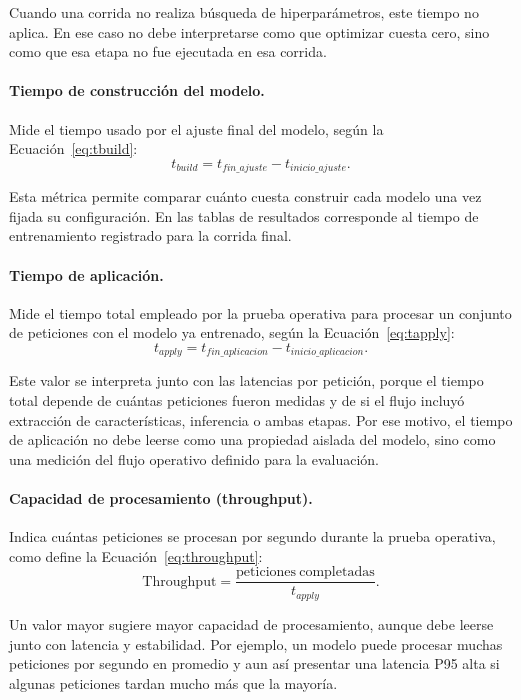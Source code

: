\documentclass[12pt,oneside]{report}
\begin{document}
Cuando una corrida no realiza búsqueda de hiperparámetros, este tiempo no aplica. En ese caso no debe interpretarse como que optimizar cuesta cero, sino como que esa etapa no fue ejecutada en esa corrida.

\paragraph{Tiempo de construcción del modelo.}
Mide el tiempo usado por el ajuste final del modelo, según la Ecuación~\eqref{eq:tbuild}:
\begin{equation}
\label{eq:tbuild}
t_{build}=t_{fin\_ajuste}-t_{inicio\_ajuste}.
\end{equation}

Esta métrica permite comparar cuánto cuesta construir cada modelo una vez fijada su configuración. En las tablas de resultados corresponde al tiempo de entrenamiento registrado para la corrida final.

\paragraph{Tiempo de aplicación.}
Mide el tiempo total empleado por la prueba operativa para procesar un conjunto de peticiones con el modelo ya entrenado, según la Ecuación~\eqref{eq:tapply}:
\begin{equation}
\label{eq:tapply}
t_{apply}=t_{fin\_aplicacion}-t_{inicio\_aplicacion}.
\end{equation}

Este valor se interpreta junto con las latencias por petición, porque el tiempo total depende de cuántas peticiones fueron medidas y de si el flujo incluyó extracción de características, inferencia o ambas etapas. Por ese motivo, el tiempo de aplicación no debe leerse como una propiedad aislada del modelo, sino como una medición del flujo operativo definido para la evaluación.

\paragraph{Capacidad de procesamiento (throughput).}
Indica cuántas peticiones se procesan por segundo durante la prueba operativa, como define la Ecuación~\eqref{eq:throughput}:
\begin{equation}
\label{eq:throughput}
\mathrm{Throughput}=\frac{\mathrm{peticiones\ completadas}}{t_{apply}}.
\end{equation}

Un valor mayor sugiere mayor capacidad de procesamiento, aunque debe leerse junto con latencia y estabilidad. Por ejemplo, un modelo puede procesar muchas peticiones por segundo en promedio y aun así presentar una latencia P95 alta si algunas peticiones tardan mucho más que la mayoría.
\end{document}
